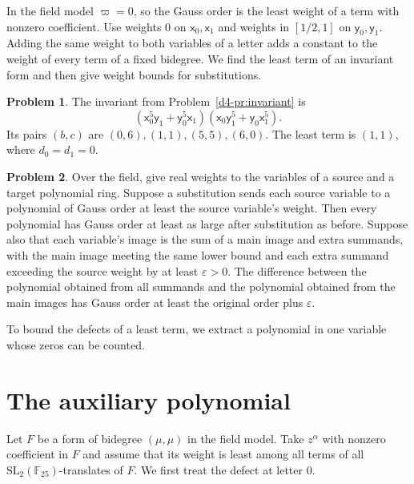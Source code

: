 \documentclass[reqno]{amsart}
\theoremstyle{plain}
\theoremstyle{definition}
\newtheorem{problem}{Problem}[section]
\theoremstyle{remark}
\newcommand{\F}{\mathbb{F}}
\newcommand{\SL}{\mathrm{SL}}
\newcommand{\xv}{\mathsf{x}}
\newcommand{\yv}{\mathsf{y}}
\begin{document}
In the field model \(\varpi=0\), so the Gauss order is the least weight of a term with nonzero coefficient.  Use weights \(0\) on \(\xv_0,\xv_1\) and weights in \([1/2,1]\) on \(\yv_0,\yv_1\).  Adding the same weight to both variables of a letter adds a constant to the weight of every term of a fixed bidegree.  We find the least term of an invariant form and then give weight bounds for substitutions.

\begin{problem}\label{pr:invariant}
The invariant from Problem~\ref{d4-pr:invariant} is
\[
  (\xv_0^5\yv_1+\yv_0^5\xv_1)(\xv_0\yv_1^5+\yv_0\xv_1^5).
\]
Its pairs \((b,c)\) are \((0,6),(1,1),(5,5),(6,0)\).  The least term is \((1,1)\), where \(d_0=d_1=0\).
\end{problem}

\begin{problem}\label{pr:substitution}
Over the field, give real weights to the variables of a source and a target polynomial ring.  Suppose a substitution sends each source variable to a polynomial of Gauss order at least the source variable's weight.  Then every polynomial has Gauss order at least as large after substitution as before.  Suppose also that each variable's image is the sum of a main image and extra summands, with the main image meeting the same lower bound and each extra summand exceeding the source weight by at least \(\varepsilon>0\).  The difference between the polynomial obtained from all summands and the polynomial obtained from the main images has Gauss order at least the original order plus \(\varepsilon\).
\end{problem}

To bound the defects of a least term, we extract a polynomial in one variable whose zeros can be counted.

\section{The auxiliary polynomial}\label{sec:aux}

Let \(F\) be a form of bidegree \((\mu,\mu)\) in the field model.  Take \(z^\alpha\) with nonzero coefficient in \(F\) and assume that its weight is least among all terms of all \(\SL_2(\F_{25})\)-translates of \(F\).  We first treat the defect at letter \(0\).
\end{document}
